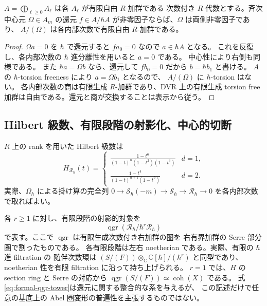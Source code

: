 \begin{lemma}[中心元を持ち上げた商の平坦性]
\label{prop:central-flatness}
$A=\bigoplus_{\ell\geq0}A_\ell$ は各 $A_\ell$ が有限自由 $R$-加群である
次数付き $R$-代数とする。斉次中心元 $\Omega\in A_m$ の還元
$f\in A/\hbar A$ が非零因子ならば、$\Omega$ は両側非零因子であり、
$A/(\Omega)$ は各内部次数で有限自由 $R$-加群である。
\end{lemma}

\begin{proof}
$\Omega a=0$ を $\hbar$ で還元すると $fa_0=0$ なので $a\in\hbar A$ となる。
これを反復し、各内部次数の $\hbar$ 進分離性を用いると $a=0$ である。
中心性により右側も同様である。
また $\hbar a=\Omega b$ なら、還元して $fb_0=0$ だから $b=\hbar b_1$ と書ける。
$A$ の $\hbar$-torsion freeness により $a=\Omega b_1$ となるので、
$A/(\Omega)$ に $\hbar$-torsion はない。
各内部次数の商は有限生成 $R$-加群であり、DVR 上の有限生成 torsion free
加群は自由である。還元と商が交換することは表示から従う。
\end{proof}

\subsection{Hilbert 級数、有限段階の射影化、中心的切断}

$R$ 上の rank を用いた Hilbert 級数は
\begin{equation}
 H_{\mathcal R_\hbar}(t)=
 \begin{cases}
 \displaystyle\frac{1-t^6}{(1-t)^n(1-t^2)(1-t^3)}&d=1,\\[6pt]
 \displaystyle\frac{1-t^4}{(1-t)^{n+1}(1-t^2)}&d=2.
 \end{cases}
 \label{eq:quantized-hilbert}
\end{equation}
実際、$\Omega_\hbar$ による掛け算の完全列
$0\to\mathcal S_\hbar(-m)\to\mathcal S_\hbar\to\mathcal R_\hbar\to0$
を各内部次数で取ればよい。

各 $r\geq1$ に対し、有限段階の射影的対象を
\begin{equation}
 \operatorname{qgr}(\mathcal R_\hbar/\hbar^r\mathcal R_\hbar)
 \label{eq:formal-qgr-tower}
\end{equation}
で表す。ここで $\operatorname{qgr}$ は有限生成次数付き右加群の圏を
右有界加群の Serre 部分圏で割ったものである。
各有限段階は左右 noetherian である。実際、有限の $\hbar$ 進 filtration の
随伴次数環は $(S/(F))\otimes_\mathbb C\mathbb C[\hbar]/(\hbar^r)$ と同型であり、
noetherian 性を有限 filtration に沿って持ち上げられる。
$r=1$ では、$H$ の section ring と Serre の対応から
$\operatorname{qgr}(S/(F))\simeq\operatorname{coh}(X)$ である。
式\eqref{eq:formal-qgr-tower}は還元に関する整合的な系を与えるが、
この記述だけで任意の基底上の Abel 圏変形の普遍性を主張するものではない。

